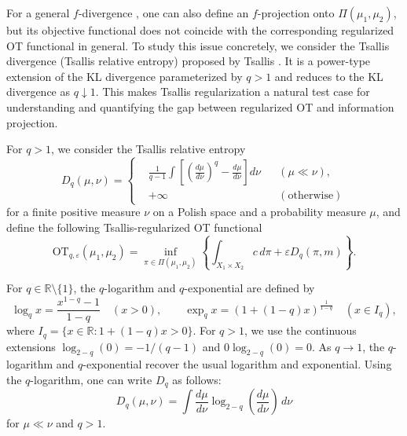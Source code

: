 \documentclass[a4paper,11pt]{article}
\theoremstyle{plain}
\theoremstyle{definition}
\theoremstyle{remark}
\theoremstyle{plain}
\numberwithin{equation}{section}
\newcommand{\R}{\mathbb R}
\newcommand{\ep}{\varepsilon}
\newcommand{\1}{\mbox{1}\hspace{-0.25em}\mbox{l}} %
\begin{document}
For a general $f$-divergence \cite{Csiszar1967, Csiszar1975}, one can also define an $f$-projection onto $\Pi(\mu_1,\mu_2)$, but its objective functional does not coincide with the corresponding regularized OT functional in general. To study this issue concretely, we consider the Tsallis divergence (Tsallis relative entropy) proposed by Tsallis \cite{T88}. It is a power-type extension of the KL divergence parameterized by $q > 1$ and reduces to the KL divergence as $q \downarrow 1$. This makes Tsallis regularization a natural test case for understanding and quantifying the gap between regularized OT and information projection.

For $q > 1$, we consider the Tsallis relative entropy
\begin{equation*}
  D_q(\mu,\nu)
  = \left\{\begin{aligned}
    &\frac{1}{q-1}\int \left[\left(\frac{d\mu}{d\nu}\right)^q-\frac{d\mu}{d\nu}\right]d\nu && (\mu\ll\nu), \\
    &+ \infty && (\mathrm{otherwise})
    \end{aligned}\right.
\end{equation*}
for a finite positive measure $\nu$ on a Polish space and a probability measure $\mu$, and define the following Tsallis-regularized OT functional
\begin{equation}\label{Tsallis-reg OT}
  \mathrm{OT}_{q,\ep}(\mu_1, \mu_2)
  = \inf_{\pi\in\Pi(\mu_1,\mu_2)}\left\{\int_{X_1 \times X_2} c\,d\pi + \ep D_q(\pi,m)\right\}.
\end{equation}

For $q \in \R\setminus\{1\}$, the $q$-logarithm and $q$-exponential are defined by
\begin{equation}\label{q-log and  q-exp}
\log_q{x} = \frac{x^{1 - q} - 1}{1 - q}\quad (x > 0), \qquad
  \exp_q{x} = \left(1 + (1-q)x\right)^{\frac{1}{1-q}}\quad (x \in I_q),
\end{equation}
where $I_q = \{x\in\R:1+(1-q)x>0\}$. For $q>1$, we use the continuous extensions $\log_{2-q}(0) = -1/(q-1)$ and $0\log_{2-q}(0) = 0$. As $q\to1$, the $q$-logarithm and $q$-exponential recover the usual logarithm and exponential. Using the $q$-logarithm, one can write $D_q$ as follows:
\begin{equation*}
D_q(\mu, \nu)
  = \int \frac{d\mu}{d\nu} \log_{2 - q}\left(\frac{d\mu}{d\nu}\right)\, d\nu
\end{equation*}
for $\mu \ll \nu$ and $q > 1$. 
\end{document}
